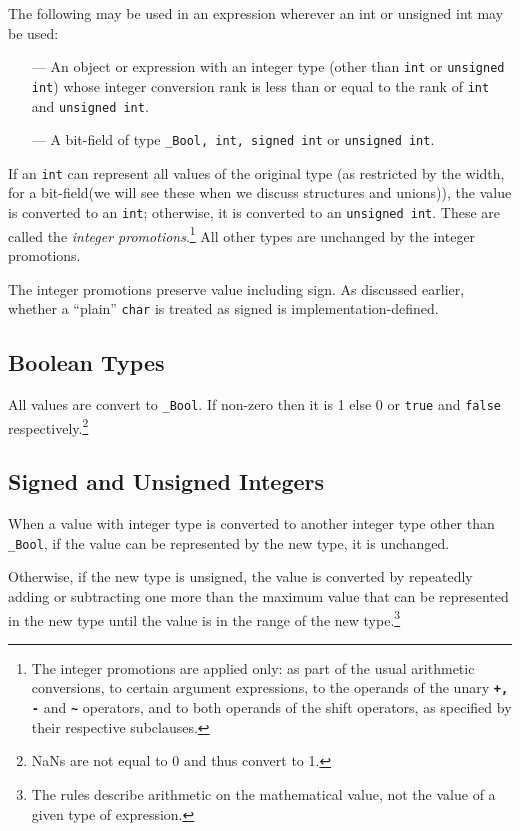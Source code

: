 The following may be used in an expression wherever an int or unsigned int may
be used:

\begin{itemize}
\item[---] An object or expression with an integer type (other than
  \texttt{int} or \texttt{unsigned int}) whose integer conversion rank is less
  than or equal to the rank of \texttt{int} and \texttt{unsigned int}.
\item[---] A bit-field of type \texttt{\_Bool, int, signed int} or \texttt{unsigned int}.
\end{itemize}

If an \texttt{int} can represent all values of the original type (as restricted
by the width, for a bit-field(we will see these when we discuss structures and
unions)), the value is converted to an \texttt{int}; otherwise, it is converted
to an \texttt{unsigned int}. These are called the \textit{integer
  promotions}.\footnote{The integer promotions are applied only: as part of the
  usual arithmetic conversions, to certain argument expressions, to the
  operands of the unary \texttt{\textbf{+, -}} and \texttt{\textbf{\~}}
  operators, and to both operands of the shift operators, as specified by their
  respective subclauses.} All other types are unchanged by the integer
promotions.

The integer promotions preserve value including sign. As discussed earlier, whether a
``plain'' \texttt{char} is treated as signed is implementation-defined.

\subsection{Boolean Types}
All values are convert to \texttt{\_Bool}. If non-zero then it is 1 else 0 or
\texttt{true} and \texttt{false} respectively.\footnote{NaNs are not equal to 0
  and thus convert to 1.}

\subsection{Signed and Unsigned Integers}
When a value with integer type is converted to another integer type other than
\texttt{\_Bool}, if the value can be represented by the new type, it is
unchanged.

Otherwise, if the new type is unsigned, the value is converted by repeatedly
adding or subtracting one more than the maximum value that can be represented
in the new type until the value is in the range of the new type.\footnote{The
  rules describe arithmetic on the mathematical value, not the value of a given
  type of expression.}

